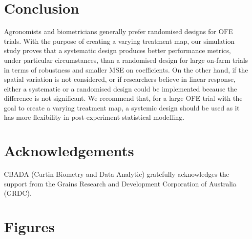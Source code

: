 \documentclass[a4paper]{article} 	%
\begin{document}
\section{Conclusion}\label{Sec:Conclusion}

Agronomists and biometricians generally prefer randomised designs for OFE trials. With the purpose of creating a varying treatment map, our simulation study proves that a systematic design produces better performance metrics, under particular circumstances, than a randomised design for large on-farm trials in terms of robustness and smaller MSE on coefficients. On the other hand, if the spatial variation is not considered, or if researchers believe in linear response, either a systematic or a randomised design could be implemented because the difference is not significant. We recommend that, for a large OFE trial with the goal to create a varying treatment map, a systemic design should be used as it has more flexibility in post-experiment statistical modelling. 


\section{Acknowledgements}

CBADA (Curtin Biometry and Data Analytic) gratefully acknowledges the support from the Grains Research and Development Corporation of Australia (GRDC).

\appendix

\section{Figures}
\end{document}
